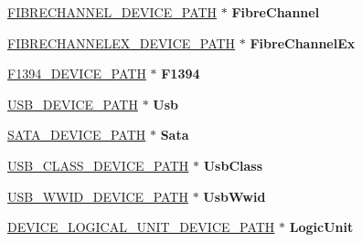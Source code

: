 \begin{DoxyCompactItemize}
\hyperlink{struct_f_i_b_r_e_c_h_a_n_n_e_l___d_e_v_i_c_e___p_a_t_h}{F\+I\+B\+R\+E\+C\+H\+A\+N\+N\+E\+L\+\_\+\+D\+E\+V\+I\+C\+E\+\_\+\+P\+A\+TH} $\ast$ {\bfseries Fibre\+Channel}
\item 
\mbox{\label{union_e_f_i___d_e_v___p_a_t_h___p_t_r_ae2ad70e806679e4e8dcb793ba660b29b}} 
\hyperlink{struct_f_i_b_r_e_c_h_a_n_n_e_l_e_x___d_e_v_i_c_e___p_a_t_h}{F\+I\+B\+R\+E\+C\+H\+A\+N\+N\+E\+L\+E\+X\+\_\+\+D\+E\+V\+I\+C\+E\+\_\+\+P\+A\+TH} $\ast$ {\bfseries Fibre\+Channel\+Ex}
\item 
\mbox{\label{union_e_f_i___d_e_v___p_a_t_h___p_t_r_ad316774e6f3e9b874329b1ee0187d551}} 
\hyperlink{struct_f1394___d_e_v_i_c_e___p_a_t_h}{F1394\+\_\+\+D\+E\+V\+I\+C\+E\+\_\+\+P\+A\+TH} $\ast$ {\bfseries F1394}
\item 
\mbox{\label{union_e_f_i___d_e_v___p_a_t_h___p_t_r_a24c08ff8dba036a0573fee82fe705149}} 
\hyperlink{struct_u_s_b___d_e_v_i_c_e___p_a_t_h}{U\+S\+B\+\_\+\+D\+E\+V\+I\+C\+E\+\_\+\+P\+A\+TH} $\ast$ {\bfseries Usb}
\item 
\mbox{\label{union_e_f_i___d_e_v___p_a_t_h___p_t_r_a0f96eb13321b1044816e9020fed24623}} 
\hyperlink{struct_s_a_t_a___d_e_v_i_c_e___p_a_t_h}{S\+A\+T\+A\+\_\+\+D\+E\+V\+I\+C\+E\+\_\+\+P\+A\+TH} $\ast$ {\bfseries Sata}
\item 
\mbox{\label{union_e_f_i___d_e_v___p_a_t_h___p_t_r_a3e383fb65e71e04f66b4dc280dfcf0fb}} 
\hyperlink{struct_u_s_b___c_l_a_s_s___d_e_v_i_c_e___p_a_t_h}{U\+S\+B\+\_\+\+C\+L\+A\+S\+S\+\_\+\+D\+E\+V\+I\+C\+E\+\_\+\+P\+A\+TH} $\ast$ {\bfseries Usb\+Class}
\item 
\mbox{\label{union_e_f_i___d_e_v___p_a_t_h___p_t_r_a849609becf2fa143c4215c8a9917c8aa}} 
\hyperlink{struct_u_s_b___w_w_i_d___d_e_v_i_c_e___p_a_t_h}{U\+S\+B\+\_\+\+W\+W\+I\+D\+\_\+\+D\+E\+V\+I\+C\+E\+\_\+\+P\+A\+TH} $\ast$ {\bfseries Usb\+Wwid}
\item 
\mbox{\label{union_e_f_i___d_e_v___p_a_t_h___p_t_r_a123f27696962a1a4ce93ed95e99327b7}} 
\hyperlink{struct_d_e_v_i_c_e___l_o_g_i_c_a_l___u_n_i_t___d_e_v_i_c_e___p_a_t_h}{D\+E\+V\+I\+C\+E\+\_\+\+L\+O\+G\+I\+C\+A\+L\+\_\+\+U\+N\+I\+T\+\_\+\+D\+E\+V\+I\+C\+E\+\_\+\+P\+A\+TH} $\ast$ {\bfseries Logic\+Unit}

\end{DoxyCompactItemize}
